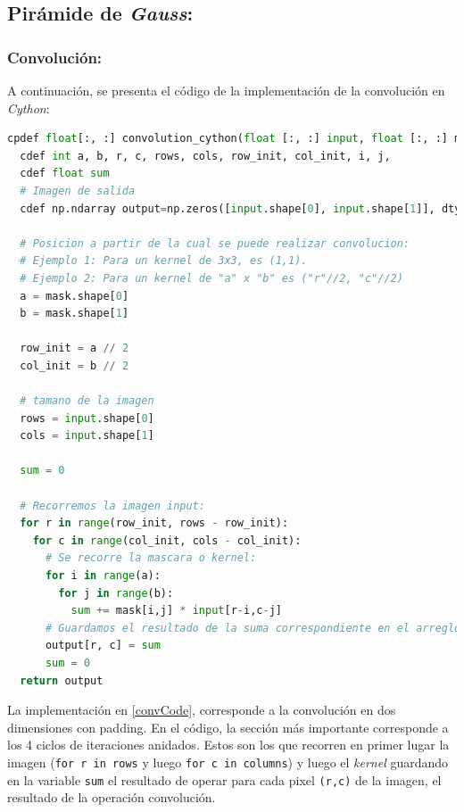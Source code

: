 \subsection{Pirámide de \textit{Gauss}:}

\subsubsection*{Convolución:}
\par A continuación, se presenta el código de la implementación de la convolución en \textit{Cython}:

\begin{lstlisting}[language=Python, label = convCode, caption=Implementación de convolución en Cython.]
  cpdef float[:, :] convolution_cython(float [:, :] input, float [:, :] mask):
  cdef int a, b, r, c, rows, cols, row_init, col_init, i, j,
  cdef float sum
  # Imagen de salida
  cdef np.ndarray output=np.zeros([input.shape[0], input.shape[1]], dtype = np.float32)

  # Posicion a partir de la cual se puede realizar convolucion: 
  # Ejemplo 1: Para un kernel de 3x3, es (1,1).
  # Ejemplo 2: Para un kernel de "a" x "b" es ("r"//2, "c"//2)
  a = mask.shape[0]
  b = mask.shape[1]

  row_init = a // 2
  col_init = b // 2

  # tamano de la imagen
  rows = input.shape[0]
  cols = input.shape[1]

  sum = 0

  # Recorremos la imagen input:
  for r in range(row_init, rows - row_init):
    for c in range(col_init, cols - col_init):
      # Se recorre la mascara o kernel:
      for i in range(a):
        for j in range(b):
          sum += mask[i,j] * input[r-i,c-j]
      # Guardamos el resultado de la suma correspondiente en el arreglo output:
      output[r, c] = sum
      sum = 0
  return output
\end{lstlisting}

\par La implementación en \ref{convCode}, corresponde a la convolución en dos dimensiones con padding. En el código, la sección más importante corresponde a los 4 ciclos de iteraciones anidados. Estos son los que recorren en primer lugar la imagen (\texttt{for r in rows} y luego \texttt{for c in columns}) y luego el \textit{kernel} guardando en la variable \texttt{sum} el resultado de operar para cada pixel \texttt{(r,c)} de la imagen, el resultado de la operación convolución. 


